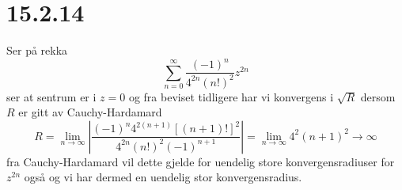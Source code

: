 \documentclass{report}
\newcommand{\nbrack}[1]{\left( #1 \right)}
\newcommand{\bbrack}[1]{\left[ #1 \right]}
\newcommand{\limtoinf}[1]{\lim_{#1 \rightarrow \infty}}
\begin{document}
\section*{15.2.14}
Ser på rekka
\begin{equation}
  \label{eq:32}
  \sum_{n=0}^{\infty} \frac{(-1)^{n}}{4^{2n}(n!)^{2}} z^{2n}
\end{equation}
ser at sentrum er i $z = 0$ og fra beviset tidligere har vi konvergens i $\sqrt{R}$ dersom $R$ er gitt av Cauchy-Hardamard
\begin{equation}
  \label{eq:33}
  R = \limtoinf{n} \left| \frac{(-1)^{n} 4^{2(n+1)} \bbrack{ (n+1)! }^{2}}{4^{2n}(n!)^{2} (-1)^{n+1}} \right|
  = \limtoinf{n} 4^{2} \nbrack{ n+1 }^{2} \to \infty
\end{equation}
fra Cauchy-Hardamard vil dette gjelde for uendelig store konvergensradiuser for $z^{2n}$ også og vi har dermed en uendelig stor konvergensradius.
\end{document}
